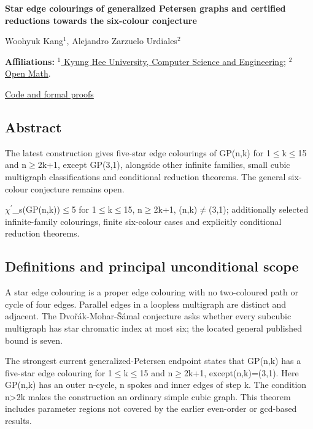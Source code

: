 \documentclass[11pt,a4paper]{article}
\begin{document}
{\LARGE\bfseries Star edge colourings of generalized Petersen graphs and certified reductions towards the six-colour conjecture\par}\medskip
{\small Woohyuk Kang\ensuremath{^1}, Alejandro Zarzuelo Urdiales\ensuremath{^2}\par}\medskip
{\small\textbf{Affiliations:} \href{https://www.kyunghee.edu/eng/user/main/view.do}{\ensuremath{^1} Kyung Hee University, Computer Science and Engineering}; \href{https://rsihouse.ai/openmath}{\ensuremath{^2} Open Math}.\par}

{\small\href{https://github.com/alejandrozu/openmath-2026-judging}{Code and formal proofs}\par}

\subsection{Abstract}
The latest construction gives five-star edge colourings of GP(n,k) for 1\ensuremath{\leq}k\ensuremath{\leq}15 and n\ensuremath{\geq}2k+1, except GP(3,1), alongside other infinite families, small cubic multigraph classifications and conditional reduction theorems. The general six-colour conjecture remains open.

\ensuremath{\chi}\ensuremath{^{\prime}}\_s(GP(n,k))\ensuremath{\leq}5 for 1\ensuremath{\leq}k\ensuremath{\leq}15, n\ensuremath{\geq}2k+1, (n,k)\ensuremath{\neq}(3,1); additionally selected infinite-family colourings, finite six-colour cases and explicitly conditional reduction theorems.

\subsection{Definitions and principal unconditional scope}
A star edge colouring is a proper edge colouring with no two-coloured path or cycle of four edges. Parallel edges in a loopless multigraph are distinct and adjacent. The Dvořák-Mohar-Šámal conjecture asks whether every subcubic multigraph has star chromatic index at most six; the located general published bound is seven.

The strongest current generalized-Petersen endpoint states that GP(n,k) has a five-star edge colouring for 1\ensuremath{\leq}k\ensuremath{\leq}15 and n\ensuremath{\geq}2k+1, except(n,k)=(3,1). Here GP(n,k) has an outer n-cycle, n spokes and inner edges of step k. The condition n>2k makes the construction an ordinary simple cubic graph. This theorem includes parameter regions not covered by the earlier even-order or gcd-based results.
\end{document}
